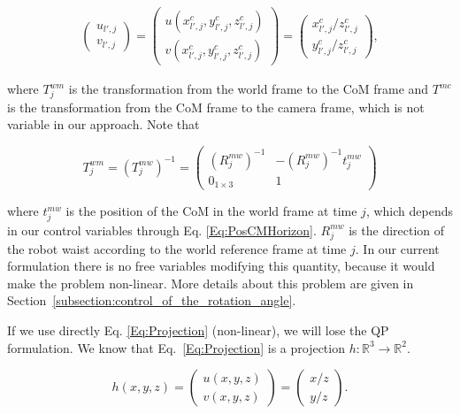 \begin{equation}
\label{Eq:Projection}
\begin{array}{c}
 \left(
 \begin{matrix}
  u_{l',j} \\
  v_{l',j}
\end{matrix}
\right)
  =
 \left(
 \begin{matrix}
  u(x^{c}_{l',j},y^{c}_{l',j},z^{c}_{l',j}) \\
  v(x^{c}_{l',j},y^{c}_{l',j},z^{c}_{l',j})
 \end{matrix}
 \right)
 =  \left(
 \begin{matrix}
  x^{c}_{l',j} / z^{c}_{l',j}\\
  y^{c}_{l',j} / z^{c}_{l',j}
 \end{matrix}
 \right),
 \end{array}
\end{equation}

where $T^{wm}_j$ is the transformation from the world frame to the CoM frame and $T^{mc}$ is the transformation from the CoM frame to the camera frame, which is not variable in our approach. Note that

$$
T^{wm}_j = (T^{mw}_j)^{-1} = 
\left(
\begin{matrix}
(R^{mw}_j)^{-1} & -(R^{mw}_j)^{-1}t^{mw}_j \\
0_{1 \times 3} & 1
\end{matrix}
\right)
$$ 

where $t^{mw}_j$ is the position of the CoM in the world frame at time $j$, which depends in our control variables through Eq. \ref{Eq:PosCMHorizon}.
$R^{mw}_j$ is the direction of the robot waist according to the world reference frame at time $j$. In our current formulation 
there is no free variables modifying this quantity, because it would make the problem non-linear. More details
about this problem are given in Section~\ref{subsection:control_of_the_rotation_angle}.

If we use directly Eq. \ref{Eq:Projection} (non-linear), we will lose the QP formulation. 
We know that Eq.~\ref{Eq:Projection} is a projection $h:\mathbb{R}^3 \rightarrow \mathbb{R}^2$.

\begin{equation*}
h(x,y,z) =
 \left(
 \begin{matrix}
  u(x,y,z) \\
  v(x,y,z)
 \end{matrix}
 \right)
 = \left(
 \begin{matrix}
  x / z\\
  y / z
 \end{matrix}
 \right).
\end{equation*}


